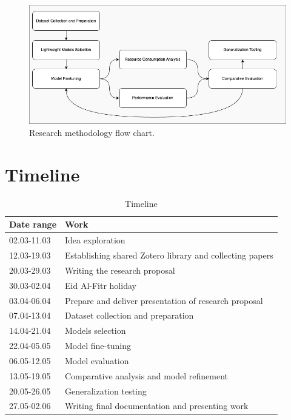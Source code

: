 \documentclass{article}
\begin{document}
\vspace{1cm}
\begin{figure}[h]
    \centering
    \includegraphics[width=1\linewidth]{research_methodology.drawio.png}
    \caption{Research methodology flow chart.}
    \label{fig:enter-label}
\end{figure}
\newpage
\section{Timeline}
\begin{table}[h]
    \centering
    \begin{tabular}{|p{2cm}|p{9cm}|}
        \hline
         \cellcolor[gray]{0.8}\textbf{Date range}&\cellcolor[gray]{0.8}\textbf{Work} \\[5pt]
         \hline
         02.03-11.03&Idea exploration \\
         12.03-19.03&Establishing shared Zotero library and collecting papers \\
         20.03-29.03&Writing the research proposal \\
         30.03-02.04&Eid Al-Fitr holiday \\
         03.04-06.04&Prepare and deliver presentation of research proposal \\
         07.04-13.04&Dataset collection and preparation \\
         14.04-21.04&Models selection \\
         22.04-05.05&Model fine-tuning \\
         06.05-12.05&Model evaluation \\
         13.05-19.05&Comparative analysis and model refinement \\
         20.05-26.05&Generalization testing \\
         27.05-02.06&Writing final documentation and presenting work \\
         \hline
    \end{tabular}   
    \caption{Timeline}
    \label{tab:my_label}
\end{table}
\end{document}
